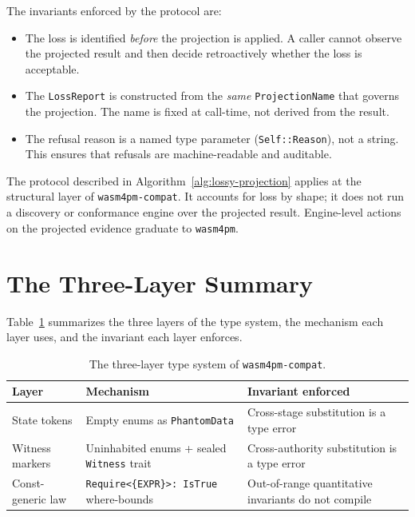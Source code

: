 The invariants enforced by the protocol are:
\begin{itemize}
  \item The loss is identified \emph{before} the projection is applied.
    A caller cannot observe the projected result and then decide retroactively
    whether the loss is acceptable.
  \item The \texttt{LossReport} is constructed from the \emph{same}
    \texttt{ProjectionName} that governs the projection. The name is fixed at
    call-time, not derived from the result.
  \item The refusal reason is a named type parameter (\texttt{Self::Reason}),
    not a string. This ensures that refusals are machine-readable and auditable.
\end{itemize}

\begin{remark}
  The protocol described in Algorithm~\ref{alg:lossy-projection} applies at
  the structural layer of \texttt{wasm4pm-compat}. It accounts for loss by
  shape; it does not run a discovery or conformance engine over the projected
  result. Engine-level actions on the projected evidence graduate to
  \texttt{wasm4pm}.
\end{remark}

\section{The Three-Layer Summary}
\label{sec:arch-summary}

Table~\ref{tab:three-layers} summarizes the three layers of the type system,
the mechanism each layer uses, and the invariant each layer enforces.

\begin{table}[h]
  \centering
  \caption{The three-layer type system of \texttt{wasm4pm-compat}.}
  \label{tab:three-layers}
  \begin{tabular}{@{}lll@{}}
    \toprule
    \textbf{Layer} & \textbf{Mechanism} & \textbf{Invariant enforced} \\
    \midrule
    State tokens
      & Empty enums as \texttt{PhantomData}
      & Cross-stage substitution is a type error \\
    Witness markers
      & Uninhabited enums + sealed \texttt{Witness} trait
      & Cross-authority substitution is a type error \\
    Const-generic law
      & \texttt{Require<\{EXPR\}>: IsTrue} where-bounds
      & Out-of-range quantitative invariants do not compile \\
    \bottomrule
  \end{tabular}
\end{table}


